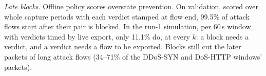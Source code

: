 \emph{Late blocks.} Offline policy scores overstate prevention. On validation, scored over whole capture periods with each verdict stamped at flow end, 99.5\% of attack flows start after their pair is blocked. In the run-1 simulation, per 60\,s window with verdicts timed by live export, only 11.1\% do, at every $k$: a block needs a verdict, and a verdict needs a flow to be exported. Blocks still cut the later packets of long attack flows (34--71\% of the DDoS-SYN and DoS-HTTP windows' packets).
